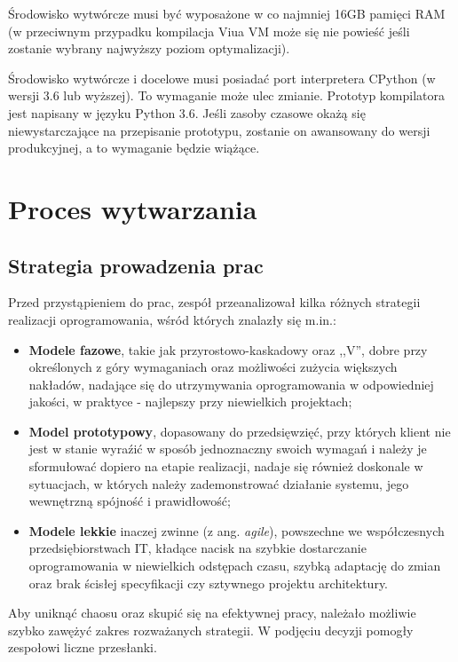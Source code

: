 \documentclass[11pt,oneside,a4paper,titlepage,onecolumn]{article}
\begin{document}
Środowisko wytwórcze musi być wyposażone w co najmniej 16GB pamięci RAM (w przeciwnym przypadku kompilacja
Viua VM może się nie powieść jeśli zostanie wybrany najwyższy poziom optymalizacji).

Środowisko wytwórcze i docelowe musi posiadać port interpretera CPython (w wersji 3.6 lub wyższej). To
wymaganie może ulec zmianie. Prototyp kompilatora jest napisany w języku Python 3.6. Jeśli zasoby czasowe
okażą się niewystarczające na przepisanie prototypu, zostanie on awansowany do wersji produkcyjnej, a to
wymaganie będzie wiążące.

\section{Proces wytwarzania}

\subsection{Strategia prowadzenia prac}
Przed przystąpieniem do prac, zespół przeanalizował kilka różnych strategii realizacji oprogramowania, wśród których znalazły się m.in.:
\begin{itemize}
	\item \textbf{Modele fazowe}, takie jak przyrostowo-kaskadowy oraz ,,V'', dobre przy określonych z góry wymaganiach 
	oraz możliwości zużycia większych nakładów, nadające się do utrzymywania oprogramowania w odpowiedniej jakości, w praktyce - najlepszy przy niewielkich projektach;
	\item \textbf{Model prototypowy}, dopasowany do przedsięwzięć, przy których klient nie jest w stanie wyraźić w sposób jednoznaczny swoich wymagań i należy je sformułować dopiero na etapie realizacji, nadaje się również doskonale w sytuacjach, w których należy zademonstrować działanie systemu, jego wewnętrzną spójność i prawidłowość;
	\item \textbf{Modele lekkie} inaczej zwinne (z ang. \textit{agile}), powszechne we współczesnych przedsiębiorstwach IT, kładące nacisk na szybkie dostarczanie oprogramowania w niewielkich odstępach czasu, szybką adaptację do zmian oraz brak ścisłej specyfikacji czy sztywnego projektu architektury.
\end{itemize}

Aby uniknąć chaosu oraz skupić się na efektywnej pracy, należało możliwie szybko zawężyć zakres rozważanych strategii. W podjęciu decyzji pomogły zespołowi liczne przesłanki. 
\end{document}
